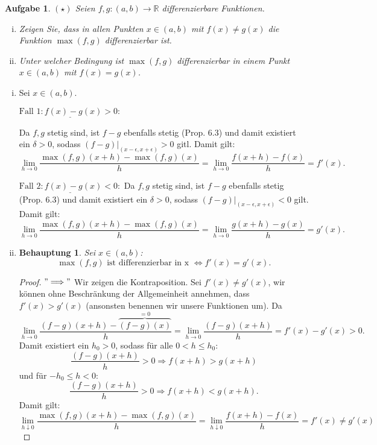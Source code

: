 \documentclass[a4paper, 20]{exam}
\newtheorem{ex}{Aufgabe}
\newtheorem{claim}{Behauptung}
\newcommand\RR{\mathbb{R}}
\begin{document}
\begin{ex}{$(\star)$}
Seien $f,g : (a,b) \longrightarrow \RR$ differenzierbare Funktionen.
\begin{enumerate}[i.)]
\item
Zeigen Sie, dass in allen Punkten $x\in (a,b)$ mit $f(x) \neq g(x)$ die Funktion $\max(f,g)$ differenzierbar ist.
\item
Unter welcher Bedingung ist $\max(f,g)$ differenzierbar in einem Punkt $x\in (a,b)$ mit $f(x)=g(x)$.
\end{enumerate}
\end{ex}
\begin{solution}
\begin{enumerate}[i.)]
\item
Sei $x\in (a,b)$.

$\underline{ \text{Fall }1:f(x)-g(x) >0:}$

Da $f,g$ stetig sind, ist $f-g$ ebenfalls stetig (Prop. 6.3) und damit existiert ein $\delta>0$, sodass $(f-g)|_{(x-\epsilon, x+\epsilon)}>0$ gitl. Damit gilt:
$$ \lim_{h\rightarrow 0} \frac{\max(f,g)(x+h) - \max(f,g)(x)}{h}
= \lim_{h\rightarrow 0} \frac{f(x+h) - f(x)}{h} = f'(x).$$

$\underline{ \text{Fall }2:f(x)-g(x) <0:}$
Da $f,g$ stetig sind, ist $f-g$ ebenfalls stetig (Prop. 6.3) und damit existiert ein $\delta>0$, sodass $(f-g)|_{(x-\epsilon, x+\epsilon)}<0$ gilt. Damit gilt:
$$ \lim_{h\rightarrow 0} \frac{\max(f,g)(x+h) - \max(f,g)(x)}{h}
= \lim_{h\rightarrow 0} \frac{g(x+h) - g(x)}{h} = g'(x).$$
\item
\begin{claim}
Sei $x\in (a,b)$:
$$ \max(f,g) \text{ ist differenzierbar in x } \Longleftrightarrow f'(x)=g'(x).$$
\end{claim}
\begin{proof}
$" \Longrightarrow "$ Wir zeigen die Kontraposition. Sei $f'(x)\neq g'(x)$, wir k\"onnen ohne Beschr\"ankung der Allgemeinheit annehmen, dass $f'(x) > g'(x)$ (ansonsten benennen wir unsere Funktionen um). Da $$\lim_{h \rightarrow 0} \frac{(f-g)(x+h)-\overbrace{(f-g)(x)}^{=0}}{h} 
=\lim_{h \rightarrow 0} \frac{(f-g)(x+h)}{h}= f'(x)-g'(x) >0.$$
Damit existiert ein $h_0>0$, sodass f\"ur alle $0<h\leq h_0$:
$$\frac{(f-g)(x+h)}{h} >0 \Longrightarrow f(x+h)>g(x+h)$$
und f\"ur $-h_0\leq h <0$:
$$\frac{(f-g)(x+h)}{h} >0 \Longrightarrow f(x+h)<g(x+h) .$$
Damit gilt:
$$ \lim_{h\downarrow 0} \frac{\max(f,g)(x+h) - \max(f,g)(x)}{h}
= \lim_{h\downarrow 0} \frac{f(x+h) - f(x)}{h} = f'(x) \neq g'(x)$$


\end{proof}
\end{enumerate}
\end{solution}
\end{document}
